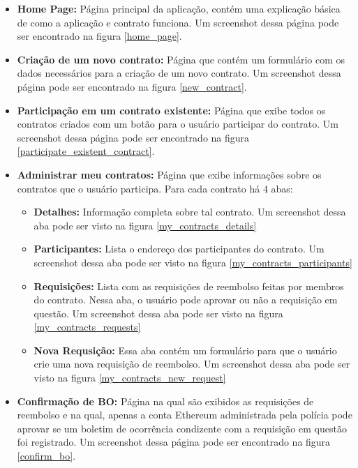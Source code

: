 \begin{itemize}
\item \textbf{Home Page:} Página principal da aplicação, contém uma explicação básica de como a aplicação e contrato funciona. Um screenshot dessa página pode ser encontrado na figura \ref{home_page}.
\item \textbf{Criação de um novo contrato:} Página que contém um formulário com os dados necessários para a criação de um novo contrato. Um screenshot dessa página pode ser encontrado na figura \ref{new_contract}.
\item \textbf{Participação em um contrato existente:} Página que exibe todos os contratos criados com um botão para o usuário participar do contrato. Um screenshot dessa página pode ser encontrado na figura \ref{participate_existent_contract}.
\item \textbf{Administrar meu contratos:} Página que exibe informações sobre os contratos que o usuário participa. Para cada contrato há 4 abas:
	\begin{itemize}
	\item \textbf{Detalhes:} Informação completa sobre tal contrato. Um screenshot dessa aba pode ser visto na figura \ref{my_contracts_details}
    \item \textbf{Participantes:} Lista o endereço dos participantes do contrato. Um screenshot dessa aba pode ser visto na figura \ref{my_contracts_participants}
    \item \textbf{Requisições:} Lista com as requisições de reembolso feitas por membros do contrato. Nessa aba, o usuário pode aprovar ou não a requisição em questão. Um screenshot dessa aba pode ser visto na figura \ref{my_contracts_requests}
    \item \textbf{Nova Requsição:} Essa aba contém um formulário para que o usuário crie uma nova requisição de reembolso. Um screenshot dessa aba pode ser visto na figura \ref{my_contracts_new_request}
	\end{itemize}
\item \textbf{Confirmação de BO:} Página na qual são exibidos as requisições de reembolso e na qual, apenas a conta Ethereum administrada pela polícia pode aprovar se um boletim de ocorrência condizente com a requisição em questão foi registrado. Um screenshot dessa página pode ser encontrado na figura \ref{confirm_bo}.
\end{itemize}

